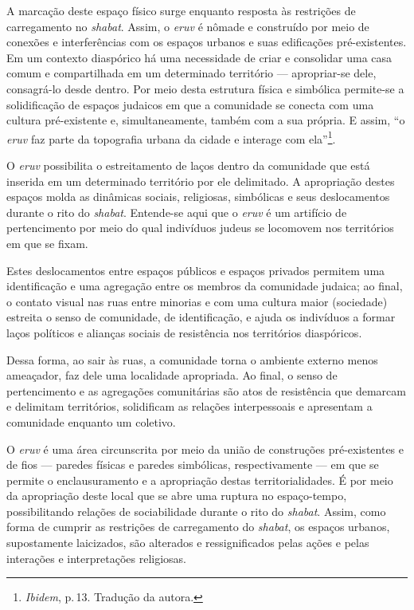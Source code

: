 A marcação deste espaço físico surge enquanto resposta às restrições de
carregamento no \emph{shabat}. Assim, o \emph{eruv} é nômade e
construído por meio de conexões e interferências com os espaços urbanos
e suas edificações pré-existentes. Em um contexto diaspórico há uma
necessidade de criar e consolidar uma casa comum e compartilhada em um
determinado território --- apropriar-se dele, consagrá-lo desde dentro.
Por meio desta estrutura física e simbólica permite-se a solidificação
de espaços judaicos em que a comunidade se conecta com uma cultura
pré-existente e, simultaneamente, também com a sua própria. E assim,
``o \emph{eruv} faz parte da topografia urbana da cidade e interage com
ela''\footnote{\emph{Ibidem}, p.\,13. Tradução da autora.}.

O \emph{eruv} possibilita o estreitamento de laços dentro da comunidade
que está inserida em um determinado território por ele delimitado. A
apropriação destes espaços molda as dinâmicas sociais, religiosas,
simbólicas e seus deslocamentos durante o rito do \emph{shabat}.
Entende-se aqui que o \emph{eruv} é um artifício de pertencimento por
meio do qual indivíduos judeus se locomovem nos territórios em que se
fixam.

Estes deslocamentos entre espaços públicos e espaços privados permitem
uma identificação e uma agregação entre os membros da comunidade
judaica; ao final, o contato visual nas ruas entre minorias e com uma
cultura maior (sociedade) estreita o senso de comunidade, de
identificação, e ajuda os indivíduos a formar laços políticos e alianças
sociais de resistência nos territórios diaspóricos.

Dessa forma, ao sair às ruas, a comunidade torna o ambiente externo
menos ameaçador, faz dele uma localidade apropriada. Ao final, o senso
de pertencimento e as agregações comunitárias são atos de resistência
que demarcam e delimitam territórios, solidificam as relações
interpessoais e apresentam a comunidade enquanto um coletivo.

\begin{center}\end{center}

\noindent{}O \emph{eruv} é uma área circunscrita por meio da união de construções
pré-existentes e de fios --- paredes físicas e paredes simbólicas,
respectivamente --- em que se permite o enclausuramento e a apropriação
destas territorialidades. É por meio da apropriação deste local que se
abre uma ruptura no espaço-tempo, possibilitando relações de
sociabilidade durante o rito do \emph{shabat}. Assim, como forma de
cumprir as restrições de carregamento do \emph{shabat}, os espaços
urbanos, supostamente laicizados, são alterados e ressignificados pelas
ações e pelas interações e interpretações religiosas.

